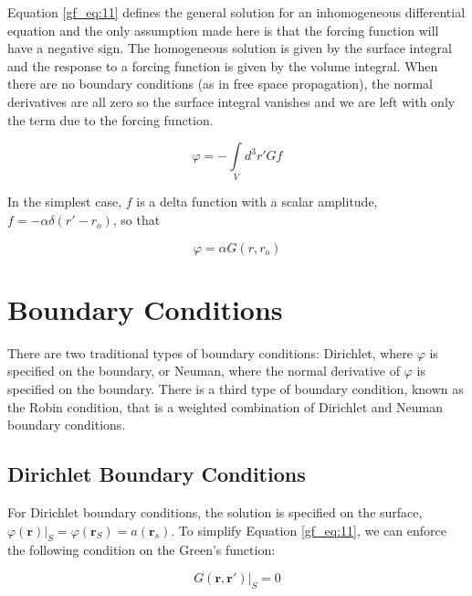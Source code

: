 Equation \ref{gf_eq:11} defines the general solution for an inhomogeneous differential equation and the only assumption made here is that the forcing function will have a negative sign. The homogeneous solution is given by the surface integral and the response to a forcing function is given by the volume integral. When there are no boundary conditions (as in free space propagation), the normal derivatives are all zero so the surface integral vanishes and we are left with only the term due to the forcing function.

\begin{equation}
\varphi = -\int\limits_{V}d^3r' Gf
\label{gf_eq:11aa}
\end{equation}
\renewcommand{\baselinestretch}{2} \small\normalsize

In the simplest case, $f$ is a delta function with a scalar amplitude, $ f = -\alpha\delta(r'-r_o)$, so that

\begin{equation}
\varphi = \alpha G(r,r_o)
\label{gf_eq:11ab}
\end{equation}
\renewcommand{\baselinestretch}{2} \small\normalsize

\section {Boundary Conditions}
There are two traditional types of boundary conditions: Dirichlet, where $\varphi$ is specified on the boundary, or Neuman, where the normal derivative of $\varphi$ is specified on the boundary. There is a third type of boundary condition, known as the Robin condition, that is a weighted combination of Dirichlet and Neuman boundary conditions.

\subsection {Dirichlet Boundary Conditions}
For Dirichlet boundary conditions, the solution is specified on the surface, $\varphi\left(\mathbf{r}\right) |_{S} = \varphi\left(\mathbf{r}_S \right) = a\left(\mathbf{r}_s\right)$. To simplify Equation \ref{gf_eq:11}, we can enforce the following condition on the Green's function:

\begin{equation}
G\left(\mathbf{r},\mathbf{r}' \right)\bigg|_{S}=0
\label{gf_eq:12}
\end{equation}
\renewcommand{\baselinestretch}{2} \small\normalsize

